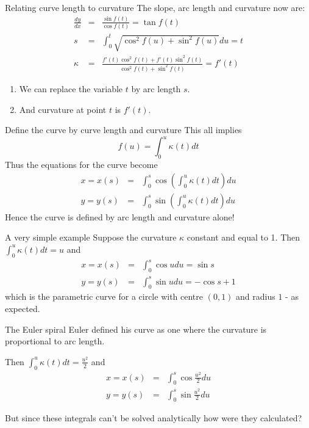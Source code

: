 \documentclass{beamer}
\begin{document}
\begin{frame}{Relating curve length to curvature}
	The slope, arc length and curvature now are:
	\begin{eqnarray*}
	\frac{dy}{dx} &=& \frac{\sin f(t)}{\cos f(t)} = \tan f(t) \\
 	s &=& \int_0^t \sqrt{\cos^2 f(u) + \sin^2 f(u)} du = t \\
 	\kappa &=& \frac{f'(t) \cos^2 f(t) + f'(t) \sin^2 f(t)}{\cos^2 f(t) + \sin^2 f(t)} = f'(t)
 \end{eqnarray*}
	\begin{enumerate}
		\item We can replace the variable $t$ by arc length $s$.
		\item And curvature at point $t$ is $f'(t)$. 
	\end{enumerate}
\end{frame}

\begin{frame}{Define the curve by curve length and curvature}
	 This all implies
	 \[
	 f(u) = \int_{0}^{u} \kappa(t) dt
	 \]
	Thus the equations for the curve become
	\begin{eqnarray*}
	x = x(s) &=& \int_{0}^{s} \cos \left( \int_0^u \kappa(t) dt \right) du \\
	y = y(s) &=& \int_{0}^{s} \sin \left( \int_0^u \kappa(t) dt \right) du
	\end{eqnarray*}
	Hence the curve is defined by arc length and curvature alone!
\end{frame}

\begin{frame}{A very simple example}
	Suppose the curvature $\kappa$ constant and equal to 1. 
	\linebreak
	\linebreak
	Then 
	$ \int_0^u \kappa(t) dt = u $ and
	\begin{eqnarray*}
		x = x(s) &=& \int_{0}^{s} \cos u du = \sin s\\
		y = y(s) &=& \int_{0}^{s} \sin u du = - \cos s + 1
	\end{eqnarray*}
	which is the parametric curve for a circle with centre $(0, 1)$ and radius $1$ - as expected.
	
\end{frame}


\begin{frame}{The Euler spiral}
	Euler defined his curve as one where the curvature is proportional to arc length.
	
	\begin{center}
	\end{center}
	Then 
	$ \int_0^u \kappa(t) dt = \frac{u^2}{2} $ and
	\begin{eqnarray*}
		x = x(s) &=& \int_{0}^{s} \cos \frac{u^2}{2} du\\
		y = y(s) &=& \int_{0}^{s} \sin \frac{u^2}{2} du
	\end{eqnarray*}

	But since these integrals can't be solved analytically how were they calculated?
\end{frame}
\end{document}

